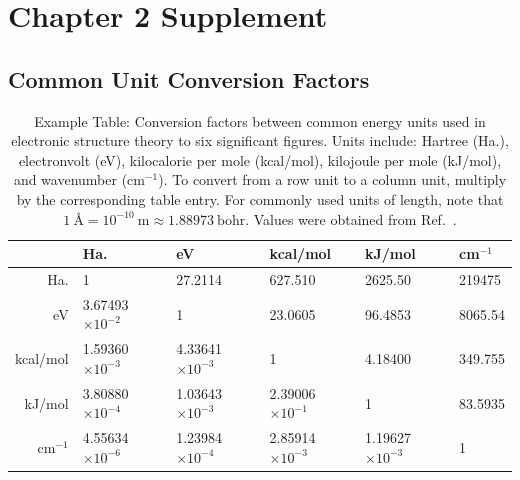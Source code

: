 \documentclass[12pt,letterpaper,oneside,titlepage,final]{dalthesis}
\numberwithin{equation}{section}
\begin{document}
\chapter{Chapter 2 Supplement} \label{A:C2sup} \thispagestyle{Chapter}


\section{Common Unit Conversion Factors} \label{A:Units}

\begin{table}[h]
\centering
\caption[Example Table: Conversion factors between common units used in electronic structure theory.]{Example Table: Conversion factors between common energy units used in electronic structure theory to six significant figures. Units include: Hartree (Ha.), electronvolt (eV), kilocalorie per mole (kcal/mol), kilojoule per mole \mbox{(kJ/mol)}, and wavenumber (cm$^{-1}$). To convert from a row unit to a column unit, multiply by the corresponding table entry. For commonly used units of length, note that $1~\text{\AA} = 10^{-10}~\text{m} \approx 1.88973~\text{bohr}$. Values were obtained from Ref.~\cite{rumble2021crc}.}
\begin{tabular}{r | lllll}
\hline
           & Ha.                     & eV                      & kcal/mol                & kJ/mol                  & cm$^{-1}$ \\ \hline
 Ha.       & 1                       & 27.2114                 & 627.510                 & 2625.50                 &  219475   \\
 eV        & 3.67493$\times 10^{-2}$ & 1                       & 23.0605                 & 96.4853                 & 8065.54   \\             
 kcal/mol  & 1.59360$\times 10^{-3}$ & 4.33641$\times 10^{-3}$ & 1                       & 4.18400                 & 349.755   \\             
 kJ/mol    & 3.80880$\times 10^{-4}$ & 1.03643$\times 10^{-3}$ & 2.39006$\times 10^{-1}$ & 1                       & 83.5935   \\             
 cm$^{-1}$ & 4.55634$\times 10^{-6}$ & 1.23984$\times 10^{-4}$ & 2.85914$\times 10^{-3}$ & 1.19627$\times 10^{-3}$ & 1         \\ \hline
 \end{tabular}
\end{table}
\end{document}
